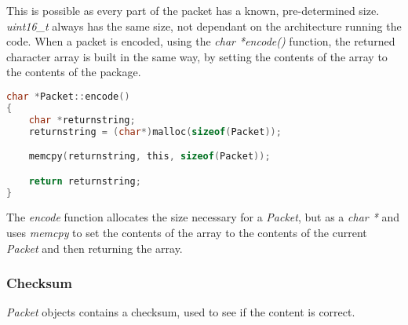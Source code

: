 This is possible as every part of the packet has a known, pre-determined size. \textit{uint16\_t} always has the same size, not dependant on the architecture running the code. When a packet is encoded, using the \textit{char *encode()} function, the returned character array is built in the same way, by setting the contents of the array to the contents of the package.

\begin{lstlisting}[language=C]
char *Packet::encode()
{
    char *returnstring;
    returnstring = (char*)malloc(sizeof(Packet));

    memcpy(returnstring, this, sizeof(Packet));

    return returnstring;
}
\end{lstlisting}
The \textit{encode} function allocates the size necessary for a \textit{Packet}, but as a \textit{char *} and uses \textit{memcpy} to set the contents of the array to the contents of the current \textit{Packet} and then returning the array.

\subsubsection{Checksum}
\textit{Packet} objects contains a checksum, used to see if the content is correct. 